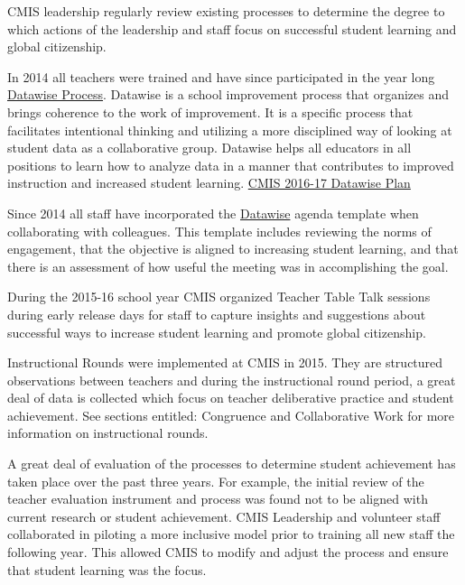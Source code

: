 \begin{findings}
CMIS leadership regularly review existing processes to determine the degree to which actions of the leadership and staff focus on successful student learning and global citizenship.

In 2014 all teachers were trained and have since participated in the year long \href{https://drive.google.com/a/cmis.ac.th/file/d/0B71_pYxcTLo-OExlV0Y5UVFBNVU/view?usp=sharing}{Datawise Process}. Datawise is a school improvement process that organizes and brings coherence to the work of improvement. It is a specific process that facilitates intentional thinking and utilizing a more disciplined way of looking at student data as a collaborative group. Datawise helps all educators in all positions to learn how to analyze data in a manner that contributes to improved instruction and increased student learning. \href{https://docs.google.com/document/d/1TmnCp5qZiZAUMnUmaU32PBn2UGvCMVtFO8r5OsxwNo4/edit}{CMIS 2016-17 Datawise Plan}

Since 2014 all staff  have incorporated the \href{https://docs.google.com/a/cmis.ac.th/document/d/1IFIRIT2wAu1GF2yZ5FSSOdFB3yBKxzx_eCZhdFtroC0/edit?usp=sharing}{Datawise} agenda template when collaborating with colleagues. This template includes reviewing the norms of engagement, that the objective is aligned to increasing student learning, and that there is an assessment of how useful the meeting was in accomplishing the goal.

During the 2015-16 school year CMIS organized Teacher Table Talk sessions during early release days for staff to capture insights and suggestions about successful ways to increase student learning and promote global citizenship.


Instructional Rounds were implemented at CMIS in 2015. They are structured observations between teachers and during the instructional round period, a great deal of data is collected which focus on teacher deliberative practice and student achievement. See sections entitled: Congruence and Collaborative Work for more information on instructional rounds. 


A great deal of evaluation of the processes to determine student achievement has taken place over the past three years. For example, the initial review of the teacher evaluation instrument and process was found not to be aligned with current research or student achievement. CMIS Leadership and volunteer staff collaborated in piloting a more inclusive model prior to training all new staff the following year. This allowed CMIS to modify and adjust the process and ensure that student learning was the focus. 


\end{findings}
